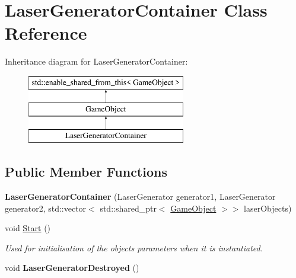 \hypertarget{class_laser_generator_container}{}\section{Laser\+Generator\+Container Class Reference}
\label{class_laser_generator_container}
Inheritance diagram for Laser\+Generator\+Container\+:\begin{figure}[H]
\begin{center}
\leavevmode
\includegraphics[height=3.000000cm]{dd/d9a/class_laser_generator_container}
\end{center}
\end{figure}
\subsection*{Public Member Functions}
\begin{DoxyCompactItemize}
\item 
\mbox{\label{class_laser_generator_container_a682432fe75fbca52e43c5fef2e3473ae}} 
{\bfseries Laser\+Generator\+Container} (Laser\+Generator generator1, Laser\+Generator generator2, std\+::vector$<$ std\+::shared\+\_\+ptr$<$ \hyperlink{class_game_object}{Game\+Object} $>$$>$ laser\+Objects)
\item 
void \hyperlink{class_laser_generator_container_a9fc676b255f742a97ec0eb6036491684}{Start} ()
\begin{DoxyCompactList}\small\item\em Used for initialisation of the objects parameters when it is instantiated. \end{DoxyCompactList}\item 
\mbox{\label{class_laser_generator_container_abd2fe127203087ed4642101e1f738b05}} 
void {\bfseries Laser\+Generator\+Destroyed} ()
\end{DoxyCompactItemize}
